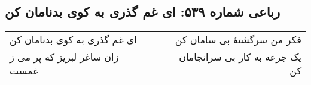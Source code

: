\begin{center}
\section*{رباعی شماره ۵۳۹: ای غم گذری به کوی بدنامان کن}
\label{sec:sh539}
\begin{longtable}{l p{0.5cm} r}
ای غم گذری به کوی بدنامان کن
&&
فکر من سرگشتهٔ بی سامان کن
\\
زان ساغر لبریز که پر می ز غمست
&&
یک جرعه به کار بی سرانجامان کن
\\
\end{longtable}
\end{center}
